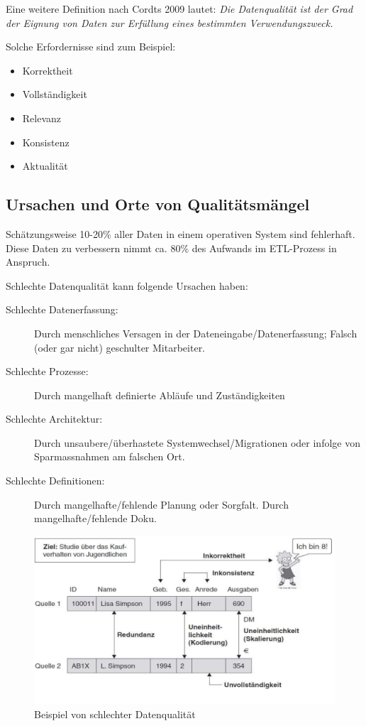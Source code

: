 \documentclass[a4paper, 11pt]{article}
\begin{document}
\noindent Eine weitere Definition nach Cordts 2009 lautet: \textit{Die Datenqualität ist der Grad der Eignung von Daten zur Erfüllung eines bestimmten Verwendungszweck.}

Solche Erfordernisse sind zum Beispiel:
\begin{itemize}
	\item Korrektheit
	\item Vollständigkeit
	\item Relevanz
	\item Konsistenz
	\item Aktualität
\end{itemize}

\subsection{Ursachen und Orte von Qualitätsmängel}
Schätzungsweise 10-20\% aller Daten in einem operativen System sind fehlerhaft. Diese Daten zu verbessern nimmt ca. 80\% des Aufwands im ETL-Prozess in Anspruch.

Schlechte Datenqualität kann folgende Ursachen haben:

\begin{description}
	\item[Schlechte Datenerfassung: ] Durch menschliches Versagen in der Dateneingabe/Datenerfassung; Falsch (oder gar nicht) geschulter Mitarbeiter.
	\item[Schlechte Prozesse: ] Durch mangelhaft definierte Abläufe und Zuständigkeiten
	\item[Schlechte Architektur: ] Durch unsaubere/überhastete Systemwechsel/Migrationen oder infolge von Sparmassnahmen am falschen Ort.
	\item[Schlechte Definitionen: ] Durch mangelhafte/fehlende Planung oder Sorgfalt. Durch mangelhafte/fehlende Doku.
\end{description}

\begin{figure}[htb!]
	\centering
	\includegraphics[keepaspectratio=true,height=13\baselineskip]{data_quality.PNG}
	\caption{Beispiel von schlechter Datenqualität}
\end{figure}
\end{document}
